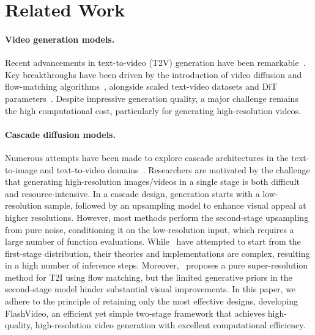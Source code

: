 \section{Related Work}


\paragraph{Video generation models.} Recent advancements in text-to-video (T2V) generation have been remarkable~\citep{yan2021videogpt, cogvideo, videopoet, ho2022video, blattmann2023align, blattmann2023stable, sora, kling, vidu, luma2024dream, moviegen, pyramid_flow}. Key breakthroughs have been driven by the introduction of video diffusion and flow-matching algorithms~\citep{diffusion, ho2020denoising, rectifiedflow, fm}, alongside scaled text-video datasets and DiT parameters~\citep{peebles2023scalable}. Despite impressive generation quality, a major challenge remains the high computational cost, particularly for generating high-resolution videos.




\paragraph{Cascade diffusion models.} Numerous attempts have been made to explore cascade architectures in the text-to-image and text-to-video domains~\citep{saharia2022image, gu2023matryoshka, ho2022cascaded, stablecascade, upscaleavideo, supir, lavie, venhancer}. Researchers are motivated by the challenge that generating high-resolution images/videos in a single stage is both difficult and resource-intensive. In a cascade design, generation starts with a low-resolution sample, followed by an upsampling model to enhance visual appeal at higher resolutions. However, most methods perform the second-stage upsampling from pure noise, conditioning it on the low-resolution input, which requires a large number of function evaluations. While~\citep{zheng2024cogview3, teng2023relay, i2vgen, xing2024simda} have attempted to start from the first-stage distribution, their theories and implementations are complex, resulting in a high number of inference steps. Moreover,~\citep{boosting} proposes a pure super-resolution method for T2I using flow matching, but the limited generative priors in the second-stage model hinder substantial visual improvements. In this paper, we adhere to the principle of retaining only the most effective designs, developing FlashVideo, an efficient yet simple two-stage framework that achieves high-quality, high-resolution video generation with excellent computational efficiency.



